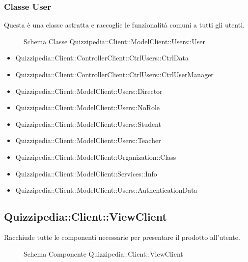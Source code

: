\subsubsection{Classe User}
Questa è una classe astratta e raccoglie le funzionalità comuni a tutti gli utenti.
\begin{figure}[H]
\centering
\noindent{}
\caption{Schema Classe Quizzipedia::Client::ModelClient::Users::User}
\end{figure}
\begin{itemize}
\item Quizzipedia::Client::ControllerClient::CtrlUsers::CtrlData
\item Quizzipedia::Client::ControllerClient::CtrlUsers::CtrlUserManager
\item Quizzipedia::Client::ModelClient::Users::Director
\item Quizzipedia::Client::ModelClient::Users::NoRole
\item Quizzipedia::Client::ModelClient::Users::Student
\item Quizzipedia::Client::ModelClient::Users::Teacher
\end{itemize}
\begin{itemize}
\item Quizzipedia::Client::ModelClient::Organization::Class
\item Quizzipedia::Client::ModelClient::Services::Info
\item Quizzipedia::Client::ModelClient::Users::AuthenticationData
\end{itemize}
\subsection{Quizzipedia::Client::ViewClient}
Racchiude tutte le componenti necessarie per presentare il prodotto all'utente.
\begin{figure}[H]
\centering
\noindent{}
\caption[Quizzipedia::Client::ViewClient]{Schema Componente Quizzipedia::Client::ViewClient}
\end{figure}
